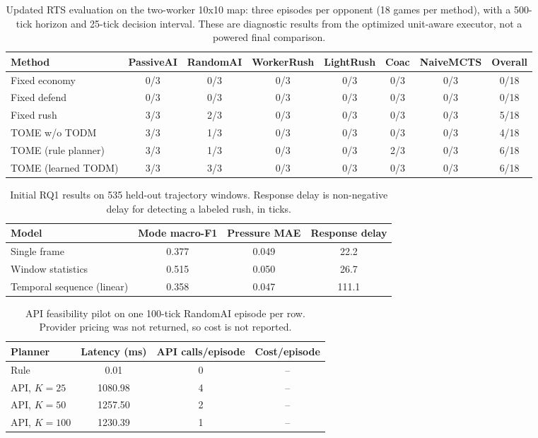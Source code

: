 \documentclass[11pt]{article}
\begin{document}
\begin{table}[t]
\centering
\small
\caption{Updated RTS evaluation on the two-worker 10x10 map: three episodes per
opponent (18 games per method), with a 500-tick horizon and 25-tick decision
interval. These are diagnostic results from the optimized unit-aware executor,
not a powered final comparison.}
\label{tab:main}
\begin{tabular}{lccccccc}
\toprule
Method & PassiveAI & RandomAI & WorkerRush & LightRush & Coac & NaiveMCTS & Overall \\
\midrule
Fixed economy & 0/3 & 0/3 & 0/3 & 0/3 & 0/3 & 0/3 & 0/18 \\
Fixed defend & 0/3 & 0/3 & 0/3 & 0/3 & 0/3 & 0/3 & 0/18 \\
Fixed rush & 3/3 & 2/3 & 0/3 & 0/3 & 0/3 & 0/3 & 5/18 \\
TOME w/o TODM & 3/3 & 1/3 & 0/3 & 0/3 & 0/3 & 0/3 & 4/18 \\
TOME (rule planner) & 3/3 & 1/3 & 0/3 & 0/3 & 2/3 & 0/3 & 6/18 \\
TOME (learned TODM) & 3/3 & 3/3 & 0/3 & 0/3 & 0/3 & 0/3 & 6/18 \\
\bottomrule
\end{tabular}
\end{table}

\begin{table}[t]
\centering
\small
\caption{Initial RQ1 results on 535 held-out trajectory windows. Response delay
is non-negative delay for detecting a labeled rush, in ticks.}
\label{tab:rq1}
\begin{tabular}{lccc}
\toprule
Model & Mode macro-F1 & Pressure MAE & Response delay \\
\midrule
Single frame & 0.377 & 0.049 & 22.2 \\
Window statistics & 0.515 & 0.050 & 26.7 \\
Temporal sequence (linear) & 0.358 & 0.047 & 111.1 \\
\bottomrule
\end{tabular}
\end{table}

\begin{table}[t]
\centering
\small
\caption{API feasibility pilot on one 100-tick RandomAI episode per row.
Provider pricing was not returned, so cost is not reported.}
\label{tab:efficiency}
\begin{tabular}{lccc}
\toprule
Planner & Latency (ms) & API calls/episode & Cost/episode \\
\midrule
Rule & 0.01 & 0 & -- \\
API, $K=25$ & 1080.98 & 4 & -- \\
API, $K=50$ & 1257.50 & 2 & -- \\
API, $K=100$ & 1230.39 & 1 & -- \\
\bottomrule
\end{tabular}
\end{table}
\end{document}
